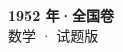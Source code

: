 \documentclass[zihao=-4, a4paper]{ctexart}
\begin{document}
\begin{center}
  {\Large\bfseries 1952 年·全国卷}\\[4pt]
  {\large 数学 · 试题版}
\end{center}
\medskip
{}

\end{document}
